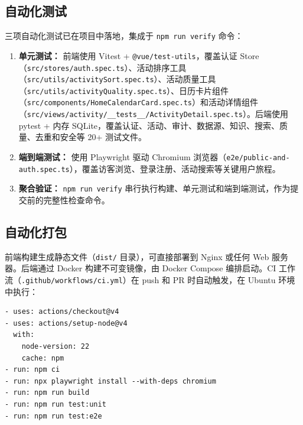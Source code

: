 \documentclass[12pt,a4paper]{ctexart}
\begin{document}
\subsection{自动化测试}
三项自动化测试已在项目中落地，集成于 \texttt{npm run verify} 命令：
\begin{enumerate}
\item \textbf{单元测试：} 前端使用 Vitest + \texttt{@vue/test-utils}，覆盖认证 Store（\texttt{src/stores/auth.spec.ts}）、活动排序工具（\texttt{src/utils/activitySort.spec.ts}）、活动质量工具（\texttt{src/utils/activityQuality.spec.ts}）、日历卡片组件（\texttt{src/components/HomeCalendarCard.spec.ts}）和活动详情组件（\texttt{src/views/activity/\_\_tests\_\_/ActivityDetail.spec.ts}）。后端使用 pytest + 内存 SQLite，覆盖认证、活动、审计、数据源、知识、搜索、质量、去重和安全等 20+ 测试文件。
\item \textbf{端到端测试：} 使用 Playwright 驱动 Chromium 浏览器（\texttt{e2e/public-and-auth.spec.ts}），覆盖访客浏览、登录注册、活动搜索等关键用户旅程。
\item \textbf{聚合验证：} \texttt{npm run verify} 串行执行构建、单元测试和端到端测试，作为提交前的完整性检查命令。
\end{enumerate}

\subsection{自动化打包}
前端构建生成静态文件（\texttt{dist/} 目录），可直接部署到 Nginx 或任何 Web 服务器。后端通过 Docker 构建不可变镜像，由 Docker Compose 编排启动。CI 工作流（\texttt{.github/workflows/ci.yml}）在 push 和 PR 时自动触发，在 Ubuntu 环境中执行：
\begin{verbatim}
- uses: actions/checkout@v4
- uses: actions/setup-node@v4
  with:
    node-version: 22
    cache: npm
- run: npm ci
- run: npx playwright install --with-deps chromium
- run: npm run build
- run: npm run test:unit
- run: npm run test:e2e
\end{verbatim}
\end{document}
